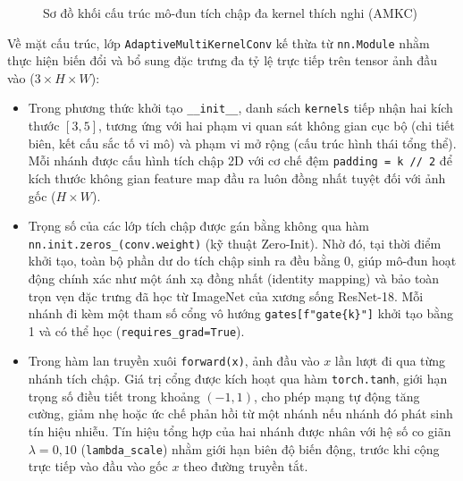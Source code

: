 \begin{figure}[H]
{%
}
\caption{Sơ đồ khối cấu trúc mô-đun tích chập đa kernel thích nghi (AMKC)}
\label{fig:amkc_architecture}
\end{figure}

Về mặt cấu trúc, lớp \texttt{Adaptive\allowbreak MultiKernel\allowbreak Conv} kế thừa từ \texttt{nn.Module} nhằm thực hiện biến đổi và bổ sung đặc trưng đa tỷ lệ trực tiếp trên tensor ảnh đầu vào ($3\times H\times W$):
\begin{itemize}
  \item Trong phương thức khởi tạo \texttt{\_\_init\_\_}, danh sách \texttt{kernels} tiếp nhận hai kích thước $[3, 5]$, tương ứng với hai phạm vi quan sát không gian cục bộ (chi tiết biên, kết cấu sắc tố vi mô) và phạm vi mở rộng (cấu trúc hình thái tổng thể). Mỗi nhánh được cấu hình tích chập 2D với cơ chế đệm \texttt{padding = k // 2} để kích thước không gian feature map đầu ra luôn đồng nhất tuyệt đối với ảnh gốc ($H \times W$).
  \item Trọng số của các lớp tích chập được gán bằng không qua hàm \texttt{nn.init.zeros\_(conv.weight)} (kỹ thuật Zero-Init). Nhờ đó, tại thời điểm khởi tạo, toàn bộ phần dư do tích chập sinh ra đều bằng 0, giúp mô-đun hoạt động chính xác như một ánh xạ đồng nhất (identity mapping) và bảo toàn trọn vẹn đặc trưng đã học từ ImageNet của xương sống ResNet-18. Mỗi nhánh đi kèm một tham số cổng vô hướng \texttt{gates[f"gate\{k\}"]} khởi tạo bằng 1 và có thể học (\texttt{requires\_grad=True}).
  \item Trong hàm lan truyền xuôi \texttt{forward(x)}, ảnh đầu vào $x$ lần lượt đi qua từng nhánh tích chập. Giá trị cổng được kích hoạt qua hàm \texttt{torch.tanh}, giới hạn trọng số điều tiết trong khoảng $(-1, 1)$, cho phép mạng tự động tăng cường, giảm nhẹ hoặc ức chế phản hồi từ một nhánh nếu nhánh đó phát sinh tín hiệu nhiễu. Tín hiệu tổng hợp của hai nhánh được nhân với hệ số co giãn $\lambda = 0{,}10$ (\texttt{lambda\_scale}) nhằm giới hạn biên độ biến động, trước khi cộng trực tiếp vào đầu vào gốc $x$ theo đường truyền tắt.
\end{itemize}


